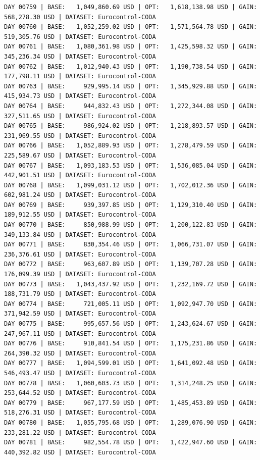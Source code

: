 \documentclass[11pt,a4paper]{article}
\begin{document}
\begin{verbatim}
DAY 00759 | BASE:   1,049,860.69 USD | OPT:   1,618,138.98 USD | GAIN: 568,278.30 USD | DATASET: Eurocontrol-CODA
DAY 00760 | BASE:   1,052,259.02 USD | OPT:   1,571,564.78 USD | GAIN: 519,305.76 USD | DATASET: Eurocontrol-CODA
DAY 00761 | BASE:   1,080,361.98 USD | OPT:   1,425,598.32 USD | GAIN: 345,236.34 USD | DATASET: Eurocontrol-CODA
DAY 00762 | BASE:   1,012,940.43 USD | OPT:   1,190,738.54 USD | GAIN: 177,798.11 USD | DATASET: Eurocontrol-CODA
DAY 00763 | BASE:     929,995.14 USD | OPT:   1,345,929.88 USD | GAIN: 415,934.73 USD | DATASET: Eurocontrol-CODA
DAY 00764 | BASE:     944,832.43 USD | OPT:   1,272,344.08 USD | GAIN: 327,511.65 USD | DATASET: Eurocontrol-CODA
DAY 00765 | BASE:     986,924.02 USD | OPT:   1,218,893.57 USD | GAIN: 231,969.55 USD | DATASET: Eurocontrol-CODA
DAY 00766 | BASE:   1,052,889.93 USD | OPT:   1,278,479.59 USD | GAIN: 225,589.67 USD | DATASET: Eurocontrol-CODA
DAY 00767 | BASE:   1,093,183.53 USD | OPT:   1,536,085.04 USD | GAIN: 442,901.51 USD | DATASET: Eurocontrol-CODA
DAY 00768 | BASE:   1,099,031.12 USD | OPT:   1,702,012.36 USD | GAIN: 602,981.24 USD | DATASET: Eurocontrol-CODA
DAY 00769 | BASE:     939,397.85 USD | OPT:   1,129,310.40 USD | GAIN: 189,912.55 USD | DATASET: Eurocontrol-CODA
DAY 00770 | BASE:     850,988.99 USD | OPT:   1,200,122.83 USD | GAIN: 349,133.84 USD | DATASET: Eurocontrol-CODA
DAY 00771 | BASE:     830,354.46 USD | OPT:   1,066,731.07 USD | GAIN: 236,376.61 USD | DATASET: Eurocontrol-CODA
DAY 00772 | BASE:     963,607.89 USD | OPT:   1,139,707.28 USD | GAIN: 176,099.39 USD | DATASET: Eurocontrol-CODA
DAY 00773 | BASE:   1,043,437.92 USD | OPT:   1,232,169.72 USD | GAIN: 188,731.79 USD | DATASET: Eurocontrol-CODA
DAY 00774 | BASE:     721,005.11 USD | OPT:   1,092,947.70 USD | GAIN: 371,942.59 USD | DATASET: Eurocontrol-CODA
DAY 00775 | BASE:     995,657.56 USD | OPT:   1,243,624.67 USD | GAIN: 247,967.11 USD | DATASET: Eurocontrol-CODA
DAY 00776 | BASE:     910,841.54 USD | OPT:   1,175,231.86 USD | GAIN: 264,390.32 USD | DATASET: Eurocontrol-CODA
DAY 00777 | BASE:   1,094,599.01 USD | OPT:   1,641,092.48 USD | GAIN: 546,493.47 USD | DATASET: Eurocontrol-CODA
DAY 00778 | BASE:   1,060,603.73 USD | OPT:   1,314,248.25 USD | GAIN: 253,644.52 USD | DATASET: Eurocontrol-CODA
DAY 00779 | BASE:     967,177.59 USD | OPT:   1,485,453.89 USD | GAIN: 518,276.31 USD | DATASET: Eurocontrol-CODA
DAY 00780 | BASE:   1,055,795.68 USD | OPT:   1,289,076.90 USD | GAIN: 233,281.22 USD | DATASET: Eurocontrol-CODA
DAY 00781 | BASE:     982,554.78 USD | OPT:   1,422,947.60 USD | GAIN: 440,392.82 USD | DATASET: Eurocontrol-CODA

\end{verbatim}
\end{document}
